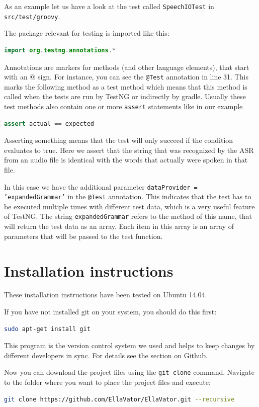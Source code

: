 \documentclass[a4paper, 12pt]{article}
\begin{document}
As an example let us have a look at the test called \texttt{SpeechIOTest} in \texttt{src/test/groovy}.

The package relevant for testing is imported like this:
\begin{lstlisting}[language=java]
import org.testng.annotations.*
\end{lstlisting}
Annotations are markers for methods (and other language elements), that start with an @ sign.
For instance, you can see the \texttt{@Test} annotation in line 31.
This marks the following method as a test method which means that this method is called when the tests are run by TestNG or indirectly by gradle.
Usually these test methods also contain one or more \texttt{assert} statements like in our example
\begin{lstlisting}[language=java]
assert actual == expected
\end{lstlisting}
Asserting something means that the test will only succeed if the condition evaluates to true.
Here we assert that the string that was recognized by the ASR from an audio file is identical with the words that actually were spoken in that file.

In this case we have the additional parameter \texttt{dataProvider = 'expandedGrammar'} in the \texttt{@Test} annotation.
This indicates that the test has to be executed multiple times with different test data, which is a very useful feature of TestNG.
The string \texttt{expandedGrammar} refers to the method of this name, that will return the test data as an array.
Each item in this array is an array of parameters that will be passed to the test function.

\newpage
\section{Installation instructions}
\label{sec:Installation_instructions}
These installation instructions have been tested on Ubuntu 14.04.

If you have not installed git on your system, you should do this first:
\begin{lstlisting}[language=bash]
sudo apt-get install git
\end{lstlisting}

This program is the version control system we used and helps to keep changes by different developers in sync.
For details see the section on Github.

Now you can download the project files using the \texttt{git clone} command.
Navigate to the folder where you want to place the project files and execute:
\begin{lstlisting}[language=bash]
git clone https://github.com/EllaVator/EllaVator.git --recursive
\end{lstlisting}
\end{document}

